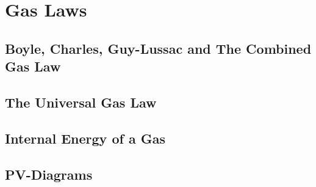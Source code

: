 \chapter{Gas Laws}
	\section{Boyle, Charles, Guy-Lussac and The Combined Gas Law}
	\section{The Universal Gas Law}
	\section{Internal Energy of a Gas}
	\section{PV-Diagrams}
	
	


